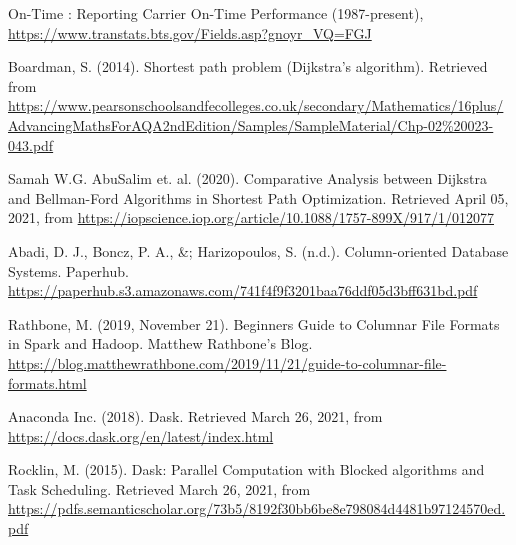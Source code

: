 \documentclass[11pt, oneside]{book}
\begin{document}
\begin{thebibliography}{111}







 On-Time : Reporting Carrier On-Time Performance (1987-present), \url{https://www.transtats.bts.gov/Fields.asp?gnoyr_VQ=FGJ}

 Boardman, S. (2014). Shortest path problem (Dijkstra’s algorithm). Retrieved from \url{https://www.pearsonschoolsandfecolleges.co.uk/secondary/Mathematics/16plus/AdvancingMathsForAQA2ndEdition/Samples/SampleMaterial/Chp-02\%20023-043.pdf}

 Samah W.G. AbuSalim et. al. (2020). Comparative Analysis between Dijkstra and Bellman-Ford Algorithms in Shortest Path Optimization. Retrieved April 05, 2021, from \url{https://iopscience.iop.org/article/10.1088/1757-899X/917/1/012077}

 Abadi, D. J., Boncz, P. A., \&; Harizopoulos, S. (n.d.). Column-oriented Database Systems. Paperhub. \url{https://paperhub.s3.amazonaws.com/741f4f9f3201baa76ddf05d3bff631bd.pdf}

 Rathbone, M. (2019, November 21). Beginners Guide to Columnar File Formats in Spark and Hadoop. Matthew Rathbone's Blog. \url{https://blog.matthewrathbone.com/2019/11/21/guide-to-columnar-file-formats.html}

 Anaconda Inc. (2018). Dask. Retrieved March 26, 2021, from \url{https://docs.dask.org/en/latest/index.html}

 Rocklin, M. (2015). Dask: Parallel Computation with Blocked algorithms and Task Scheduling. Retrieved March 26, 2021, from \url{https://pdfs.semanticscholar.org/73b5/8192f30bb6be8e798084d4481b97124570ed.pdf}


\end{thebibliography}
\end{document}
